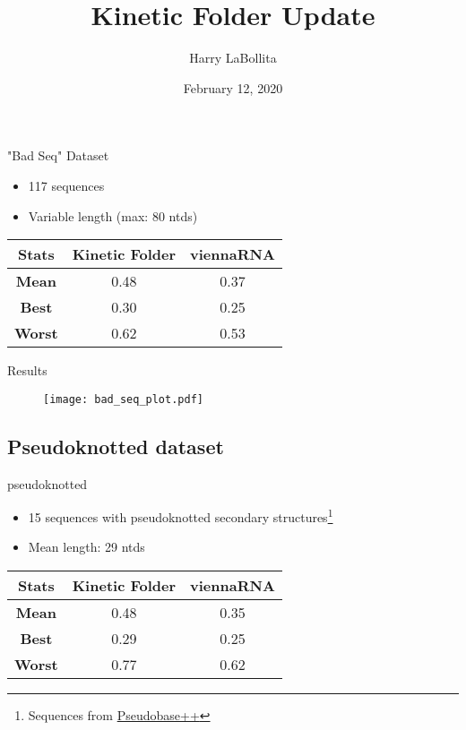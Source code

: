 \documentclass{beamer}
\author{Harry LaBollita}
\institute{Arizona State University}
\title{Kinetic Folder Update}
\date{February 12, 2020}
\begin{document}
\frame{\titlepage}

\begin{frame}{"Bad Seq" Dataset}

\begin{itemize}
\item 117 sequences
\item Variable length (max: 80 ntds)
\end{itemize}
\begin{table}
\centering
\begin{tabular}{|ccc|}
\hline
{\bf Stats} & {\bf Kinetic Folder} & {\bf viennaRNA}\\
\hline
\hline
{\bf Mean} & 0.48 & 0.37 \\
{\bf Best} & 0.30 & 0.25 \\
{\bf Worst} & 0.62 & 0.53\\
\hline
\end{tabular}
\end{table}
\end{frame}

\begin{frame}{Results}
\begin{figure}[H]
\centering
\texttt{[image: bad\_seq\_plot.pdf]}
\end{figure}
\end{frame}

\subsection*{Pseudoknotted dataset}
\begin{frame}{pseudoknotted}
\begin{itemize}
\item 15 sequences with pseudoknotted secondary structures\footnote{Sequences from \href{http://pseudobaseplusplus.utep.edu}{Pseudobase++} }
\item Mean length: 29 ntds
\end{itemize}
\begin{table}
\centering
\begin{tabular}{|ccc|}
\hline
{\bf Stats} & {\bf Kinetic Folder} & {\bf viennaRNA}\\
\hline
\hline
{\bf Mean} & 0.48 & 0.35 \\
{\bf Best} & 0.29 & 0.25 \\
{\bf Worst} & 0.77 & 0.62\\
\hline
\end{tabular}
\end{table}
\end{frame}
\end{document}
